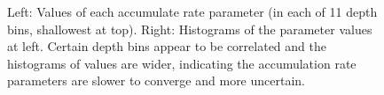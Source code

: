 \begin{figure}[ht]
\centering
{}
\caption[]{Left: Values of each accumulate rate parameter (in each of 11 depth bins, shallowest at top). Right: Histograms of the parameter values at left. Certain depth bins appear to be correlated and the histograms of values are wider, indicating the accumulation rate parameters are slower to converge and more uncertain.}
\label{fig:accumconvergence}
\end{figure}

